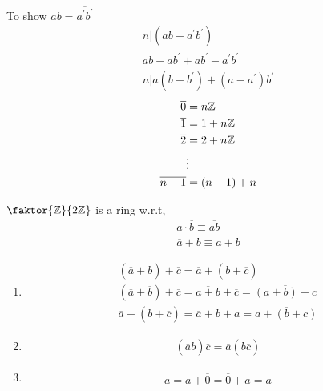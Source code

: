 \documentclass[../notes.tex]{subfiles}
\begin{document}
To show $\overline{ab}=\overline{a^{\prime}b^{\prime}}$
\begin{align*}
    n|(ab-a^{\prime}b^{\prime})\\
    ab-ab^{\prime}+ab^{\prime}-a^{\prime}b^{\prime}\\
    n|a(b-b^{\prime})+(a-a^{\prime})b^{\prime}
\end{align*}
\begin{align*}
    \overline{0}&=n\mathbb{Z}\\
    \overline{1}&=1+n\mathbb{Z}\\
    \overline{2}&=2+n\mathbb{Z}\\
    &\vdots\\
    \overline{n-1}&=(n-1)+n
\end{align*}
\begin{definition}
    $\faktor{\Z}{2\Z}$ is a ring w.r.t,
    \begin{align*}
        \overline{a}\cdot\overline{b}\equiv\overline{ab}\\
        \overline{a}+\overline{b}\equiv\overline{a+b}
    \end{align*}
    \begin{enumerate}
        \item
            \vspace{.1cm}
            \begin{align*}
                (\overline{a}+\overline{b})+\overline{c}=
                \overline{a}+(\overline{b}+\overline{c})\\
                (\overline{a}+\overline{b})+\overline{c}
                =\overline{a+b}+\overline{c}=
                \overline{(a+b)+c}\\
                \overline{a}+(\overline{b}+\overline{c})=
                \overline{a}+\overline{b+a}=\overline{a+(b+c)}
            \end{align*}
        \item
            \vspace{.1cm}
            \begin{align*}
                (\overline{a}\overline{b})\overline{c}=
                \overline{a}(\overline{b}\overline{c})
            \end{align*}
        \item
            \vspace{.1cm}
            \begin{align*}
                \overline{a}=\overline{a}+\overline{0}=
                \overline{0}+\overline{a}=\overline{a}
            \end{align*}

\end{enumerate}
\end{definition}
\end{document}

